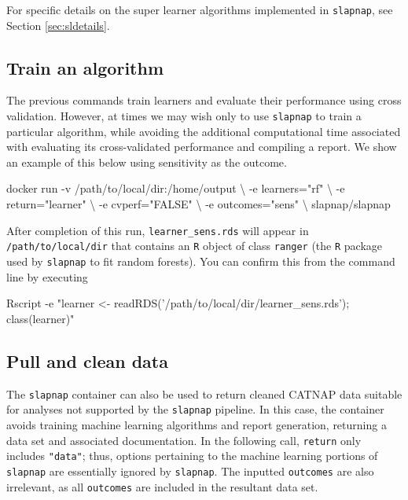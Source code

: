 \documentclass[]{article}
\newenvironment{Shaded}{\begin{snugshade}}{\end{snugshade}}
\newcommand{\StringTok}[1]{\textcolor[rgb]{0.31,0.60,0.02}{#1}}
\newcommand{\ExtensionTok}[1]{#1}
\newcommand{\NormalTok}[1]{#1}
\begin{document}
For specific details on the super learner algorithms implemented in
\texttt{slapnap}, see Section \ref{sec:sldetails}.

\subsection{Train an algorithm}\label{train-an-algorithm}

The previous commands train learners and evaluate their performance
using cross validation. However, at times we may wish only to use
\texttt{slapnap} to train a particular algorithm, while avoiding the
additional computational time associated with evaluating its
cross-validated performance and compiling a report. We show an example
of this below using sensitivity as the outcome.

\begin{Shaded}
\begin{Highlighting}[]
\ExtensionTok{docker}\NormalTok{ run -v /path/to/local/dir:/home/output \textbackslash{}}
\NormalTok{           -e learners=}\StringTok{"rf"}\NormalTok{ \textbackslash{}}
\NormalTok{           -e return=}\StringTok{"learner"}\NormalTok{ \textbackslash{}}
\NormalTok{           -e cvperf=}\StringTok{"FALSE"}\NormalTok{ \textbackslash{}}
\NormalTok{           -e outcomes=}\StringTok{"sens"}\NormalTok{ \textbackslash{}}
\NormalTok{           slapnap/slapnap}
\end{Highlighting}
\end{Shaded}

After completion of this run, \texttt{learner\_sens.rds} will appear in
\texttt{/path/to/local/dir} that contains an \texttt{R} object of class
\texttt{ranger} (the \texttt{R} package used by \texttt{slapnap} to fit
random forests). You can confirm this from the command line by executing

\begin{Shaded}
\begin{Highlighting}[]
\ExtensionTok{Rscript}\NormalTok{ -e }\StringTok{"learner <- readRDS('/path/to/local/dir/learner_sens.rds'); class(learner)"}
\end{Highlighting}
\end{Shaded}

\subsection{Pull and clean data}\label{pull-and-clean-data}

The \texttt{slapnap} container can also be used to return cleaned CATNAP
data suitable for analyses not supported by the \texttt{slapnap}
pipeline. In this case, the container avoids training machine learning
algorithms and report generation, returning a data set and associated
documentation. In the following call, \texttt{return} only includes
\texttt{"data"}; thus, options pertaining to the machine learning
portions of \texttt{slapnap} are essentially ignored by
\texttt{slapnap}. The inputted \texttt{outcomes} are also irrelevant, as
all \texttt{outcomes} are included in the resultant data set.
\end{document}
